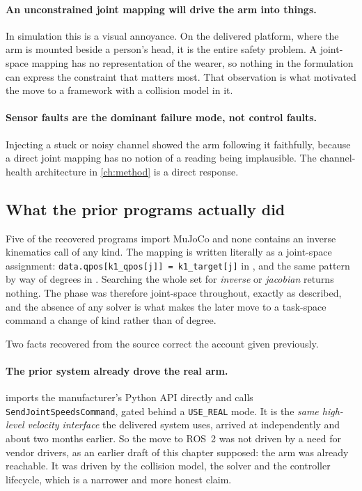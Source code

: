 \paragraph{An unconstrained joint mapping will drive the arm into things.}
In simulation this is a visual annoyance. On the delivered platform, where the
arm is mounted beside a person's head, it is the entire safety problem. A
joint-space mapping has no representation of the wearer, so nothing in the
formulation can express the constraint that matters most. That observation is
what motivated the move to a framework with a collision model in it.

\paragraph{Sensor faults are the dominant failure mode, not control faults.}
Injecting a stuck or noisy channel showed the arm following it faithfully,
because a direct joint mapping has no notion of a reading being implausible.
The channel-health architecture in \cref{ch:method} is a direct response.

\subsection{What the prior programs actually did}

Five of the recovered programs import MuJoCo and none contains an inverse
kinematics call of any kind. The mapping is written literally as a joint-space
assignment: \verb|data.qpos[k1_qpos[j]] = k1_target[j]| in
, and the same pattern by way of degrees in
. Searching the whole set for \emph{inverse} or
\emph{jacobian} returns nothing. The phase was therefore joint-space
throughout, exactly as described, and the absence of any solver is what makes
the later move to a task-space command a change of kind rather than of degree.

Two facts recovered from the source correct the account given previously.

\paragraph{The prior system already drove the real arm.} 
imports the manufacturer's Python API directly and calls
\verb|SendJointSpeedsCommand|, gated behind a \verb|USE_REAL| mode. It is the
\emph{same high-level velocity interface} the delivered system uses, arrived
at independently and about two months earlier. So the move to ROS~2 was not
driven by a need for vendor drivers, as an earlier draft of this chapter
supposed: the arm was already reachable. It was driven by the collision model,
the solver and the controller lifecycle, which is a narrower and more honest
claim.

